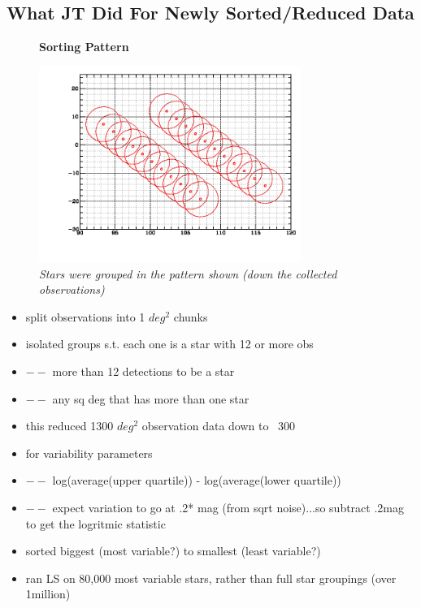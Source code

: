 \documentclass[aps,prl,twocolumn,superscriptaddress]{revtex4-1}
\begin{document}
\subsection{What JT Did For Newly Sorted/Reduced Data}

\begin{figure}[H]
 \centering
 \textbf{Sorting Pattern}\par\medskip
 	\includegraphics[width=3.35in]{figures/fromJT/sortedFOV.png}
 \caption{\it \small{Stars were grouped in the pattern shown (down the collected observations)}}
 \label{fig:sortpat}
\end{figure}

\begin{itemize}
 \item{} split observations into 1 $deg^2$ chunks
 \item{} isolated groups s.t. each one is a star with 12 or more obs
 \item{} $--$ more than 12 detections to be a star
 \item{} $--$ any sq deg that has more than one star
 \item{} this reduced 1300 $deg^2$ observation data down to ~300
 \item{} for variability parameters
 \item{} $--$ log(average(upper quartile)) - log(average(lower quartile))
 \item{} $--$ expect variation to go at .2* mag (from sqrt noise)...so subtract .2mag to get the logritmic statistic
 \item{} sorted biggest (most variable?) to smallest (least variable?)
 \item{} ran LS on 80,000 most variable stars, rather than full star groupings (over 1million)
\end{itemize}
\end{document}
